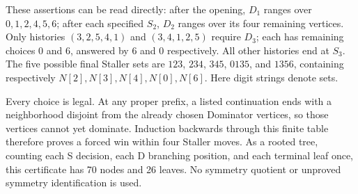 \documentclass[11pt]{article}
\begin{document}
These assertions can be read directly: after the opening, $D_1$ ranges over $0,1,2,4,5,6$; after each specified $S_2$, $D_2$ ranges over its four remaining vertices. Only histories $(3,2,5,4,1)$ and $(3,4,1,2,5)$ require $D_3$; each has remaining choices 0 and 6, answered by 6 and 0 respectively. All other histories end at $S_3$. The five possible final Staller sets are $123$, $234$, $345$, $0135$, and $1356$, containing respectively $N[2],N[3],N[4],N[0],N[6]$. Here digit strings denote sets.

Every choice is legal. At any proper prefix, a listed continuation ends with a neighborhood disjoint from the already chosen Dominator vertices, so those vertices cannot yet dominate. Induction backwards through this finite table therefore proves a forced win within four Staller moves. As a rooted tree, counting each S decision, each D branching position, and each terminal leaf once, this certificate has 70 nodes and 26 leaves. No symmetry quotient or unproved symmetry identification is used.
\end{document}

